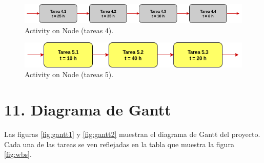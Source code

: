 \documentclass[
11pt, %
]{charter}
\begin{document}
\begin{figure}[H]
\centering
\includegraphics[scale=0.6]{./Figuras/tareas_4.png}
\caption{Activity on Node (tareas 4).}
\label{fig:tareas_4}
\end{figure}

\begin{figure}[H]
\centering
\includegraphics[scale=0.6]{./Figuras/tareas_5.png}
\caption{Activity on Node (tareas 5).}
\label{fig:tareas_5}
\end{figure}

\section{11. Diagrama de Gantt}
\label{sec:gantt}

Las figuras \ref{fig:gantt1} y \ref{fig:gantt2} muestran el diagrama de Gantt del proyecto. Cada una de las tareas se ven reflejadas en la tabla que muestra la figura \ref{fig:wbs}.
\end{document}
